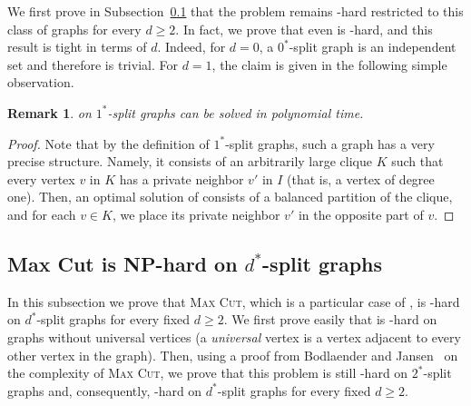 \documentclass[
final
]{dmtcs-episciences}
\newtheorem{remark}{Remark}{\bfseries}{\itshape}
\begin{document}
We first prove in Subsection~\ref{ap:NP-hard} that the problem remains {}-hard restricted to this class of graphs for every $d \geq 2$. In fact, we prove that even {} is {}-hard, and this result is tight in terms of $d$. Indeed, for $d = 0$, a $0^*$-split graph is an independent set and therefore {} is trivial. For $d = 1$, the claim is given in the following simple observation.

\begin{remark}{} on $1^*$-split graphs can be solved in polynomial time.
\end{remark}
\begin{proof} Note that by the definition of  $1^*$-split graphs, such a graph has a very precise structure. Namely, it consists of an arbitrarily large clique $K$ such that every vertex $v$ in $K$ has a private neighbor $v'$ in $I$ (that is, a vertex of degree one). Then, an optimal solution of {} consists of a balanced partition of the clique, and for each $v \in K$, we place its private neighbor $v'$ in the opposite part of $v$.
\end{proof}


\subsection{Max Cut is NP-hard on $d^*$-split graphs}
\label{ap:NP-hard}

In this subsection we prove that \textsc{Max Cut}, which is a particular case of {}, is {}-hard on $d^*$-split graphs for every fixed $d \geq 2$.
We first prove easily that {} is {}-hard on
graphs without universal vertices (a \emph{universal} vertex is a vertex adjacent to every other vertex in the graph). Then, using a proof  from Bodlaender and Jansen~\cite{bodlaender} on the complexity of \textsc{Max Cut}, we prove that this problem is still {}-hard on $2^*$-split graphs and, consequently, {}-hard on $d^*$-split graphs for every fixed $d\geq 2$.
\end{document}
